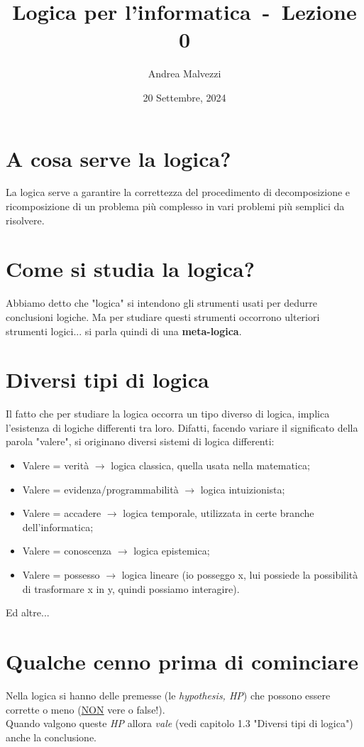 \documentclass[12pt]{article}
\author{Andrea Malvezzi}
\title{\textbf{Logica per l'informatica~-~Lezione 0}}
\date{20 Settembre, 2024}
\begin{document}
\maketitle
\pagebreak
\section{A cosa serve la logica?}
La logica serve a garantire la correttezza del procedimento di decomposizione e ricomposizione di un problema più complesso in vari problemi più semplici da risolvere.
\section{Come si studia la logica?}
Abbiamo detto che "logica" si intendono gli strumenti usati per dedurre conclusioni logiche. Ma per studiare questi strumenti occorrono ulteriori strumenti logici... si parla quindi di una \textbf{meta-logica}.
\section{Diversi tipi di logica}
Il fatto che per studiare la logica occorra un tipo diverso di logica, implica l'esistenza di logiche differenti tra loro. Difatti, facendo variare il significato della parola "valere", si originano diversi sistemi di logica differenti: 
\begin{itemize}
    \item Valere = verità $\rightarrow$ logica classica, quella usata nella matematica;
    \item Valere = evidenza/programmabilità $\rightarrow$ logica intuizionista;
    \item Valere = accadere $\rightarrow$ logica temporale, utilizzata in certe branche dell'informatica;
    \item Valere = conoscenza $\rightarrow$ logica epistemica;
    \item Valere = possesso $\rightarrow$ logica lineare (io posseggo x, lui possiede la possibilità di trasformare x in y, quindi possiamo interagire).
\end{itemize}
Ed altre...
\section{Qualche cenno prima di cominciare}
Nella logica si hanno delle premesse (le \textit{hypothesis, HP}) che possono essere corrette o meno (\underline{NON} vere o false!).\\
Quando valgono queste \textit{HP} allora \textit{vale} (vedi capitolo 1.3 "Diversi tipi di logica") anche la conclusione.\\
\end{document}

